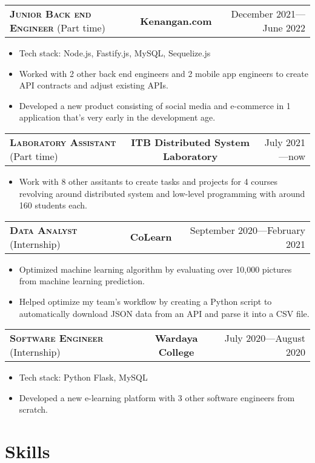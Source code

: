 \documentclass[10pt]{article}
\makeatletter
\newcommand{\workExpVspace}{1em}
\newcommand{\workExp}[6]{
    \noindent \begin{tabularx}{\textwidth}{@{}X c|r}
        \textbf{\textsc{#5}} (#2) & \textbf{#1} & #3---#4
    \end{tabularx}

    {#6}
    \vspace{\workExpVspace}
}
\makeatother
\begin{document}
\workExp
    {Kenangan.com}
    {Part time}
    {December 2021}
    {June 2022}
    {Junior Back end Engineer}
    {
        \begin{itemize}
            \item Tech stack: Node.js, Fastify.js, MySQL, Sequelize.js
            \item Worked with 2 other back end engineers and 2 mobile app engineers to create API
                contracts and adjust existing APIs.
            \item Developed a new product consisting of social media and e-commerce in 1
                application that's very early in the development age.
        \end{itemize}
    }

\workExp
    {ITB Distributed System Laboratory}
    {Part time}
    {July 2021}
    {now}
    {Laboratory Assistant}
    {
        \begin{itemize}
            \item Work with 8 other assitants to create tasks and projects for 4 courses revolving
                around distributed system and low-level programming with around 160 students each.
        \end{itemize}
    }

\workExp
    {CoLearn}
    {Internship}
    {September 2020}
    {February 2021}
    {Data Analyst}
    {
        \begin{itemize}
            \item Optimized machine learning algorithm by evaluating over 10,000 pictures from
                machine learning prediction.
            \item Helped optimize my team's workflow by creating a Python script to automatically
                download JSON data from an API and parse it into a CSV file.
        \end{itemize}
    }

\workExp
    {Wardaya College}
    {Internship}
    {July 2020}
    {August 2020}
    {Software Engineer}
    {
        \begin{itemize}
            \item Tech stack: Python Flask, MySQL
            \item Developed a new e-learning platform with 3 other software engineers from scratch.
        \end{itemize}
    }

\section{Skills}
\end{document}

